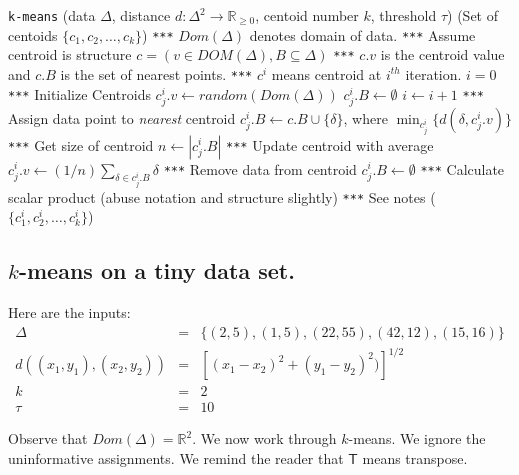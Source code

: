 \documentclass{article}
\begin{document}
{\small
\begin{center}
\begin{algorithmic}[1]\label{kmeans}
 \texttt{k-means}
 (\textsf{data} $\Delta$, distance $d:\Delta^2\rightarrow \mathbb{R}_{\geq 0}$, \textsf{centoid number} $k$, \textsf{threshold} $\tau$)
 (\textsf{Set of centoids} $\{c_1, c_2, \ldots, c_k\}$)
\State
\State \texttt{***} $Dom(\Delta)$ denotes domain of data.
\State
\State \texttt{***} Assume centroid is structure $c = (v \in DOM(\Delta), B\subseteq \Delta)$
\State  \texttt{***} $c.v$ is the centroid value and $c.B$ is the set of nearest points.
\State \texttt{***}  $c^{i}$ means centroid at $i^{th}$ iteration. 
\State
\State $i = 0$
\State \texttt{***} Initialize Centroids
\State $c_j^i.v \gets  random(Dom(\Delta))$
\State $c_j^i.B \gets \emptyset$
\EndFor
\State
\Repeat
\State $i \gets i + 1$
\State \texttt{***} Assign data point to {\it nearest} centroid
\For {$\delta \in \Delta$}
\State $c_j^i.B \gets c.B \cup \{\delta\}$, where $\min_{c_j^i}\{d(\delta, c_j^i.v)\}$
\EndFor
{}
\State \texttt{***} Get size of centroid
\State $n \gets |c_j^i.B|$
\State \texttt{***} Update centroid with average 
\State $c_j^i.v \gets (1/n)\sum_{\delta \in c_j^i.B} \delta$
\State \texttt{***} Remove data from centroid
\State $c_j^i.B \gets \emptyset$
\EndFor
\State \texttt{***} Calculate scalar product (abuse notation and structure slightly)
\State \texttt{***} See notes
 ($\{c_1^i, c_2^i, \ldots, c_k^i\}$) 
\end{algorithmic}
\end{center}}
\subsection*{$k$-means on a tiny data set.}
Here are the inputs:
\begin{eqnarray}
\Delta &=& \{  (2, 5),  (1,5) , (22, 55), (42, 12), (15,16)\}\\
d((x_1, y_1) ,(x_2, y_2)) &=& [(x_1-x_2)^2 + (y_1 - y_2)^2)]^{1/2}\\
k &=&2\\
\tau &=& 10
\end{eqnarray}

Observe that $Dom(\Delta) = \mathbb{R}^2$.  We now work through $k$-means. We ignore the uninformative assignments.  We remind the reader that $\mathsf{T}$ means transpose.
\end{document}
